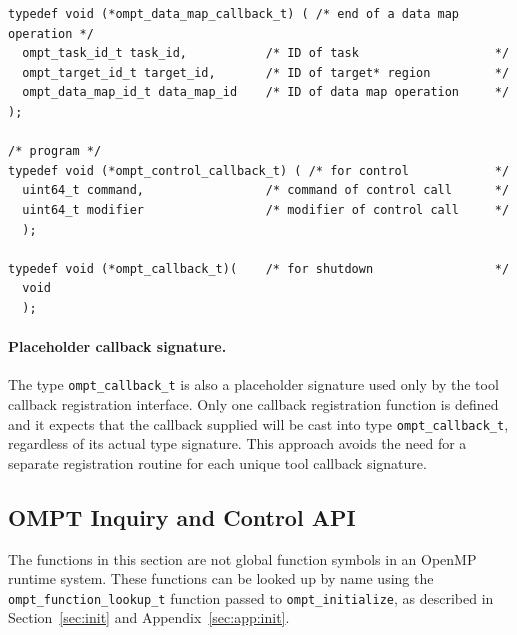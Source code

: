 \documentclass{article}
\begin{document}
\begin{verbatim}
typedef void (*ompt_data_map_callback_t) ( /* end of a data map operation */
  ompt_task_id_t task_id,           /* ID of task                   */
  ompt_target_id_t target_id,       /* ID of target* region         */
  ompt_data_map_id_t data_map_id    /* ID of data map operation     */
);

/* program */						   
typedef void (*ompt_control_callback_t) ( /* for control            */	   
  uint64_t command,                 /* command of control call      */
  uint64_t modifier                 /* modifier of control call     */
  );
  
typedef void (*ompt_callback_t)(    /* for shutdown                 */	
  void
  ); 
\end{verbatim}

\paragraph{Placeholder callback signature.} The type \verb|ompt_callback_t| is also a placeholder signature used only by the tool callback registration interface. 
Only one callback registration function is defined and it expects that the callback supplied will be cast into type \verb|ompt_callback_t|, regardless of its actual type signature. This approach avoids the need for a separate registration routine for each unique tool callback signature. 

\clearpage
\subsection{OMPT Inquiry and Control API}

The functions in this section are not global function symbols in an OpenMP runtime system. These functions can be looked up by name using the \verb|ompt_function_lookup_t| function passed to \verb|ompt_initialize|, as described in Section~\ref{sec:init} and Appendix~\ref{sec:app:init}.
\end{document}
